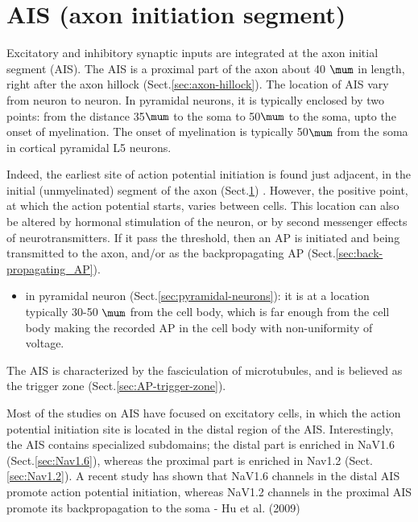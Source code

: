 
\section{AIS (axon initiation segment)}
\label{sec:AIS}
\label{sec:initial-segment-IS}
\label{sec:axon-initial-segment-AIS}


Excitatory and inhibitory synaptic inputs are integrated at the axon initial
segment (AIS). The AIS is a proximal part of the axon about 40 $\mum$ in length,
right after the axon hillock (Sect.\ref{sec:axon-hillock}). The location of AIS
vary from neuron to neuron. In pyramidal neurons, it is typically enclosed by
two points: from the distance 35$\mum$ to the soma to 50$\mum$ to the soma, upto
the onset of myelination. The onset of myelination is typically 50$\mum$ from
the soma in cortical pyramidal L5 neurons.

Indeed, the earliest site of action potential initiation is found just adjacent,
in the initial (unmyelinated) segment of the axon (Sect.\ref{sec:AIS})
\citep{clark2009}. However, the positive point, at which the action potential
starts, varies between cells. This location can also be altered by hormonal
stimulation of the neuron, or by second messenger effects of neurotransmitters.
If it pass the threshold, then an AP is initiated and being transmitted to the
axon, and/or as the backpropagating AP (Sect.\ref{sec:back-propagating_AP}).

\begin{itemize}
  
  \item  in pyramidal neuron (Sect.\ref{sec:pyramidal-neurons}): it is at a
 location typically 30-50 $\mum$ from the cell body, which is far enough from
 the cell body making the recorded AP in the cell body with non-uniformity of voltage.
   
% 

 
\end{itemize}

The AIS is characterized by the fasciculation of microtubules, and is
believed as the trigger zone  (Sect.\ref{sec:AP-trigger-zone}). 


Most of the studies on AIS have focused on excitatory cells, in which the action
potential initiation site is located in the distal region of the AIS.
Interestingly, the AIS contains specialized subdomains; the distal part is
enriched in NaV1.6 (Sect.\ref{sec:Nav1.6}), whereas the proximal part is
enriched in Nav1.2 (Sect.\ref{sec:Nav1.2}).
A recent study has shown that NaV1.6 channels in the distal AIS promote action
potential initiation, whereas NaV1.2 channels in the proximal AIS promote its
backpropagation to the soma - Hu et al. (2009)

